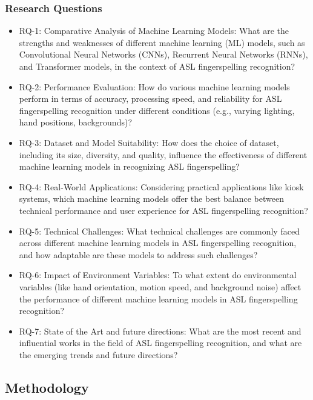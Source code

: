 \subsubsection{Research Questions}
\begin{itemize}
    \item RQ-1: Comparative Analysis of Machine Learning Models:
          What are the strengths and weaknesses of different machine learning (ML) models, such as Convolutional Neural Networks (CNNs), Recurrent Neural Networks (RNNs), and Transformer models, in the context of ASL fingerspelling recognition?
    \item RQ-2: Performance Evaluation:
          How do various machine learning models perform in terms of accuracy, processing speed, and reliability for ASL fingerspelling recognition under different conditions (e.g., varying lighting, hand positions, backgrounds)?
    \item RQ-3: Dataset and Model Suitability:
          How does the choice of dataset, including its size, diversity, and quality, influence the effectiveness of different machine learning models in recognizing ASL fingerspelling?
    \item RQ-4: Real-World Applications:
          Considering practical applications like kiosk systems, which machine learning models offer the best balance between technical performance and user experience for ASL fingerspelling recognition?
    \item RQ-5: Technical Challenges:
          What technical challenges are commonly faced across different machine learning models in ASL fingerspelling recognition, and how adaptable are these models to address such challenges?
    \item RQ-6: Impact of Environment Variables:
          To what extent do environmental variables (like hand orientation, motion speed, and background noise) affect the performance of different machine learning models in ASL fingerspelling recognition?
    \item RQ-7: State of the Art and future directions:
          What are the most recent and influential works in the field of ASL fingerspelling recognition, and what are the emerging trends and future directions?
\end{itemize}

\subsection{Methodology}

